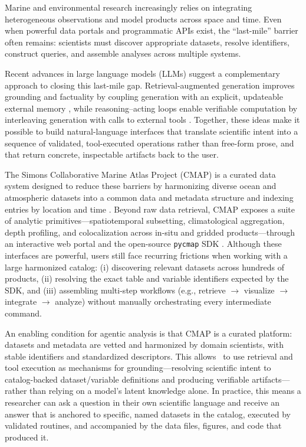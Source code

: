 Marine and environmental research increasingly relies on integrating heterogeneous observations and model products across space and time.
Even when powerful data portals and programmatic APIs exist, the ``last-mile'' barrier often remains: scientists must discover appropriate datasets,
resolve identifiers, construct queries, and assemble analyses across multiple systems.

Recent advances in large language models (LLMs) suggest a complementary approach to closing this last-mile gap.
Retrieval-augmented generation improves grounding and factuality by coupling generation with an explicit, updateable external memory \citep{Lewis2020RAG},
while reasoning--acting loops enable verifiable computation by interleaving generation with calls to external tools \citep{Yao2022ReAct,Karpas2022MRKL}.
Together, these ideas make it possible to build natural-language interfaces that translate scientific intent into a sequence of validated, tool-executed operations rather than free-form prose, and that return concrete, inspectable artifacts back to the user.

The Simons Collaborative Marine Atlas Project (CMAP) is a curated data system designed to reduce these barriers by harmonizing diverse ocean and atmospheric datasets into a common data and metadata structure and indexing entries by location and time \citep{Ashkezari2021SimonsCMAP}.
Beyond raw data retrieval, CMAP exposes a suite of analytic primitives---spatiotemporal subsetting, climatological aggregation, depth profiling, and colocalization across in-situ and gridded products---through an interactive web portal and the open-source \texttt{pycmap} SDK \citep{pycmap2023}.
Although these interfaces are powerful, users still face recurring frictions when working with a large harmonized catalog: (i) discovering relevant datasets across hundreds of products, (ii) resolving the exact table and variable identifiers expected by the SDK, and (iii) assembling multi-step workflows (e.g., retrieve $\rightarrow$ visualize $\rightarrow$ integrate $\rightarrow$ analyze) without manually orchestrating every intermediate command.

An enabling condition for agentic analysis is that CMAP is a curated platform: datasets and metadata are vetted and harmonized by domain scientists, with stable identifiers and standardized descriptors.
This allows \cmapagent\ to use retrieval and tool execution as mechanisms for grounding---resolving scientific intent to catalog-backed dataset/variable definitions and producing verifiable artifacts---rather than relying on a model's latent knowledge alone.
In practice, this means a researcher can ask a question in their own scientific language and receive an answer that is anchored to specific, named datasets in the catalog, executed by validated routines, and accompanied by the data files, figures, and code that produced it.

